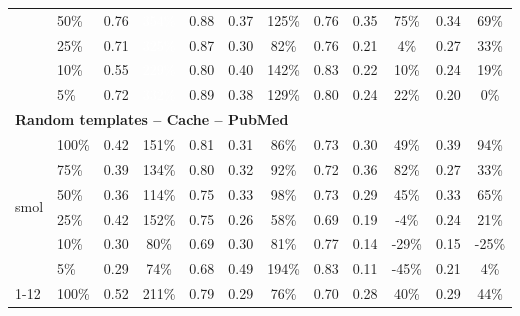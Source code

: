 \begin{longtable}{llcccccccccc}
 & 50\% & 0.76 & \cellcolor{tablegreen!100}\textcolor{white}{354\%} & 0.88 & 0.37 & \cellcolor{tablegreen!36}125\% & 0.76 & 0.35 & \cellcolor{tablegreen!21}75\% & 0.34 & \cellcolor{tablegreen!20}69\% \\
 & 25\% & 0.71 & \cellcolor{tablegreen!93}\textcolor{white}{325\%} & 0.87 & 0.30 & \cellcolor{tablegreen!23}82\% & 0.76 & 0.21 & \cellcolor{tablegreen!1}4\% & 0.27 & \cellcolor{tablegreen!9}33\% \\
 & 10\% & 0.55 & \cellcolor{tablegreen!65}\textcolor{white}{229\%} & 0.80 & 0.40 & \cellcolor{tablegreen!40}142\% & 0.83 & 0.22 & \cellcolor{tablegreen!3}10\% & 0.24 & \cellcolor{tablegreen!5}19\% \\
 & 5\% & 0.72 & \cellcolor{tablegreen!95}\textcolor{white}{332\%} & 0.89 & 0.38 & \cellcolor{tablegreen!37}129\% & 0.80 & 0.24 & \cellcolor{tablegreen!6}22\% & 0.20 & \cellcolor{tablegreen!0}0\% \\
\midrule
\multicolumn{12}{l}{\textbf{Random templates -- Cache -- PubMed}} \\
\multirow{6}{*}{smol} & 100\% & 0.42 & \cellcolor{tablegreen!43}151\% & 0.81 & 0.31 & \cellcolor{tablegreen!25}86\% & 0.73 & 0.30 & \cellcolor{tablegreen!14}49\% & 0.39 & \cellcolor{tablegreen!27}94\% \\
 & 75\% & 0.39 & \cellcolor{tablegreen!38}134\% & 0.80 & 0.32 & \cellcolor{tablegreen!26}92\% & 0.72 & 0.36 & \cellcolor{tablegreen!23}82\% & 0.27 & \cellcolor{tablegreen!10}33\% \\
 & 50\% & 0.36 & \cellcolor{tablegreen!33}114\% & 0.75 & 0.33 & \cellcolor{tablegreen!28}98\% & 0.73 & 0.29 & \cellcolor{tablegreen!13}45\% & 0.33 & \cellcolor{tablegreen!19}65\% \\
 & 25\% & 0.42 & \cellcolor{tablegreen!44}152\% & 0.75 & 0.26 & \cellcolor{tablegreen!17}58\% & 0.69 & 0.19 & \cellcolor[HTML]{E8A0A0}-4\% & 0.24 & \cellcolor{tablegreen!6}21\% \\
 & 10\% & 0.30 & \cellcolor{tablegreen!23}80\% & 0.69 & 0.30 & \cellcolor{tablegreen!23}81\% & 0.77 & 0.14 & \cellcolor[HTML]{E8A0A0}-29\% & 0.15 & \cellcolor[HTML]{E8A0A0}-25\% \\
 & 5\% & 0.29 & \cellcolor{tablegreen!21}74\% & 0.68 & 0.49 & \cellcolor{tablegreen!56}194\% & 0.83 & 0.11 & \cellcolor[HTML]{E8A0A0}-45\% & 0.21 & \cellcolor{tablegreen!1}4\% \\
\cmidrule(l){1-12}
\multirow{6}{*}{qwen} & 100\% & 0.52 & \cellcolor{tablegreen!60}211\% & 0.79 & 0.29 & \cellcolor{tablegreen!22}76\% & 0.70 & 0.28 & \cellcolor{tablegreen!11}40\% & 0.29 & \cellcolor{tablegreen!13}44\% \\

\end{longtable}
